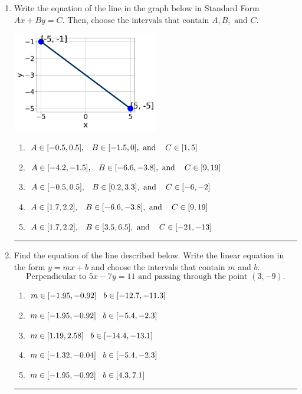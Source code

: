 \documentclass[14pt]{extbook}
\newcommand{\litem}[1]{\item#1\hspace*{-1cm}\rule{\textwidth}{0.4pt}}
\begin{document}
\begin{enumerate}
{\begin{enumerate}[label=\Alph*.]
\end{enumerate} }
\litem{
Write the equation of the line in the graph below in Standard Form $Ax+By=C$. Then, choose the intervals that contain $A, B, \text{ and } C$.
\begin{center}
    \includegraphics[width=0.5\textwidth]{../Figures/linearGraphToStandardC.png}
\end{center}
\begin{enumerate}[label=\Alph*.]
\item \( A \in [-0.5, 0.5], \hspace{3mm} B \in [-1.5, 0], \text{ and } \hspace{3mm} C \in [1, 5] \)
\item \( A \in [-4.2, -1.5], \hspace{3mm} B \in [-6.6, -3.8], \text{ and } \hspace{3mm} C \in [9, 19] \)
\item \( A \in [-0.5, 0.5], \hspace{3mm} B \in [0.2, 3.3], \text{ and } \hspace{3mm} C \in [-6, -2] \)
\item \( A \in [1.7, 2.2], \hspace{3mm} B \in [-6.6, -3.8], \text{ and } \hspace{3mm} C \in [9, 19] \)
\item \( A \in [1.7, 2.2], \hspace{3mm} B \in [3.5, 6.5], \text{ and } \hspace{3mm} C \in [-21, -13] \)

\end{enumerate} }
\litem{
Find the equation of the line described below. Write the linear equation in the form $ y=mx+b $ and choose the intervals that contain $m$ and $b$.\[ \text{Perpendicular to } 5 x - 7 y = 11 \text{ and passing through the point } (3, -9). \]\begin{enumerate}[label=\Alph*.]
\item \( m \in [-1.95, -0.92] \hspace*{3mm} b \in [-12.7, -11.3] \)
\item \( m \in [-1.95, -0.92] \hspace*{3mm} b \in [-5.4, -2.3] \)
\item \( m \in [1.19, 2.58] \hspace*{3mm} b \in [-14.4, -13.1] \)
\item \( m \in [-1.32, -0.04] \hspace*{3mm} b \in [-5.4, -2.3] \)
\item \( m \in [-1.95, -0.92] \hspace*{3mm} b \in [4.3, 7.1] \)


\end{enumerate}}
\end{enumerate}
\end{document}
